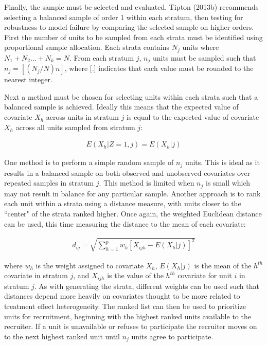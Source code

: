 \documentclass[man,floatsintext]{apa6}
\theoremstyle{definition}
\theoremstyle{definition}
\theoremstyle{definition}
\theoremstyle{remark}
\begin{document}
Finally, the sample must be selected and evaluated. Tipton (2013b)
recommends selecting a balanced sample of order 1 within each stratum,
then testing for robustness to model failure by comparing the selected
sample on higher orders. First the number of units to be sampled from
each strata must be identified using proportional sample allocation.
Each strata contains \(N_j\) units where \(N_1 + N_2 ... + N_k = N\).
From each stratum \(j\), \(n_j\) units must be sampled such that
\(n_j = [(N_j/N)n]\), where {[}.{]} indicates that each value must be
rounded to the nearest integer.

Next a method must be chosen for selecting units within each strata such
that a balanced sample is achieved. Ideally this means that the expected
value of covariate \(X_h\) across units in stratum \(j\) is equal to the
expected value of covariate \(X_h\) across all units sampled from
stratum \(j\):

\begin{align}
  E(X_h|Z = 1, j) = E(X_h|j)
\end{align}

One method is to perform a simple random sample of \(n_j\) units. This
is ideal as it results in a balanced sample on both observed and
unobserved covariates over repeated samples in stratum \(j\). This
method is limited when \(n_j\) is small which may not result in balance
for any particular sample. Another approach is to rank each unit within
a strata using a distance measure, with units closer to the ``center" of
the strata ranked higher. Once again, the weighted Euclidean distance
can be used, this time measuring the distance to the mean of each
covariate:

\begin{align} \label{eq:euclid}
  d_{ij} = \sqrt{\sum^p_{h=1}w_h[X_{ijh} - E(X_h|j)]^2}
\end{align}

where \(w_h\) is the weight assigned to covariate \(X_h\), \(E(X_h|j)\)
is the mean of the \(h^{th}\) covariate in stratum \(j\), and
\(X_{ijh}\) is the value of the \(h^{th}\) covariate for unit \(i\) in
stratum \(j\). As with generating the strata, different weights can be
used such that distances depend more heavily on covariates thought to be
more related to treatment effect heterogeneity. The ranked list can then
be used to prioritize units for recruitment, beginning with the highest
ranked units available to the recruiter. If a unit is unavailable or
refuses to participate the recruiter moves on to the next highest ranked
unit until \(n_j\) units agree to participate.
\end{document}
